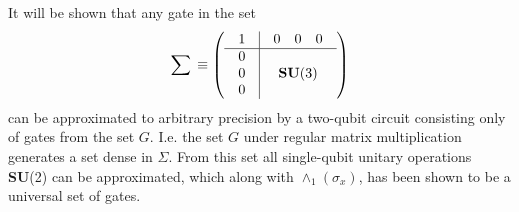 \documentclass[twocolumn,11pt]{article}
\begin{document}
It will be shown that any gate in the set
\[
\sum\,\equiv\left(\begin{array}{c|c}
1&\begin{array}{ccc}0&0&0\end{array}\\
\hline
\begin{array}{c}0\\0\\0\end{array}&\mbox{\bf SU}(3)
\end{array}\right)
\]
can be approximated to arbitrary precision by a two-qubit circuit
consisting only of gates from the set $G$.  I.e. the set $G$ under
regular matrix multiplication generates a set dense in $\Sigma$.  From
this set all single-qubit unitary operations {\bf SU}(2) can be
approximated, which along with $\wedge_1(\sigma_x)$, has been
shown \cite{egfqc} to be a universal set of gates.
\end{document}
